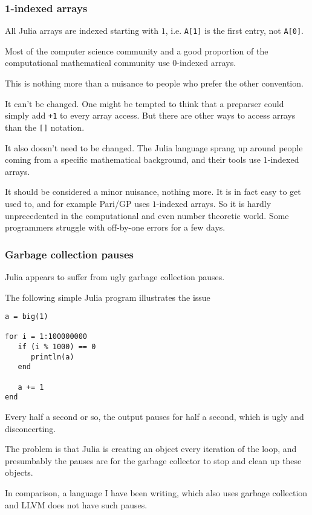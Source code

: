 \documentclass[a4paper,10pt]{article}
\newcommand{\code}{\lstinline}
\begin{document}
\subsubsection{1-indexed arrays}

All Julia arrays are indexed starting with $1$, i.e. \code{A[1]} is the first entry, not \code{A[0]}.

Most of the computer science community and a good proportion of the computational mathematical
community use $0$-indexed arrays.

This is nothing more than a nuisance to people who prefer the other convention. 

It can't be changed. One might be tempted to think that a preparser could simply add \code{+1} to
every array access. But there are other ways to access arrays than the \code{[]} notation.

It also doesn't need to be changed. The Julia language sprang up around people coming from a
specific mathematical background, and their tools use $1$-indexed arrays.

It should be considered a minor nuisance, nothing more. It is in fact easy to get used to,
and for example Pari/GP uses $1$-indexed arrays. So it is hardly unprecedented in the
computational and even number theoretic world. Some programmers struggle with off-by-one errors
for a few days.

\subsubsection{Garbage collection pauses}

Julia appears to suffer from ugly garbage collection pauses.

The following simple Julia program illustrates the issue

\begin{lstlisting}
a = big(1)

for i = 1:100000000
   if (i % 1000) == 0
      println(a)
   end
   
   a += 1
end
\end{lstlisting}

Every half a second or so, the output pauses for half a second, which is ugly and disconcerting.

The problem is that Julia is creating an object every iteration of the loop, and presumbably the
pauses are for the garbage collector to stop and clean up these objects.

In comparison, a language I have been writing, which also uses garbage collection and LLVM does
not have such pauses. 
\end{document}
